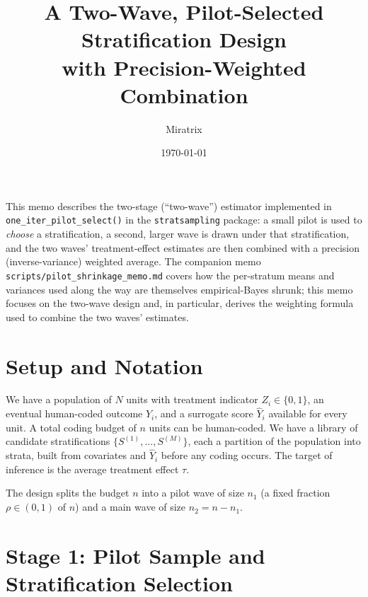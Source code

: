\documentclass[12pt]{article}
\begin{document}
\author{Miratrix}
\title{A Two-Wave, Pilot-Selected Stratification Design\\ with Precision-Weighted Combination}
\date{\today}

\maketitle

This memo describes the two-stage (``two-wave'') estimator implemented in \texttt{one\_iter\_pilot\_select()} in the \texttt{stratsampling} package: a small pilot is used to \emph{choose} a stratification, a second, larger wave is drawn under that stratification, and the two waves' treatment-effect estimates are then combined with a precision (inverse-variance) weighted average.
The companion memo \texttt{scripts/pilot\_shrinkage\_memo.md} covers how the per-stratum means and variances used along the way are themselves empirical-Bayes shrunk; this memo focuses on the two-wave design and, in particular, derives the weighting formula used to combine the two waves' estimates.


\section{Setup and Notation}
\label{sec:setup}

We have a population of $N$ units with treatment indicator $Z_i \in \{0,1\}$, an eventual human-coded outcome $Y_i$, and a surrogate score $\hat Y_i$ available for every unit.
A total coding budget of $n$ units can be human-coded.
We have a library of candidate stratifications $\{S^{(1)}, \dots, S^{(M)}\}$, each a partition of the population into strata, built from covariates and $\hat Y_i$ before any coding occurs.
The target of inference is the average treatment effect $\tau$.

The design splits the budget $n$ into a pilot wave of size $n_1$ (a fixed fraction $\rho \in (0,1)$ of $n$) and a main wave of size $n_2 = n - n_1$.


\section{Stage 1: Pilot Sample and Stratification Selection}
\label{sec:stage1}
\end{document}
